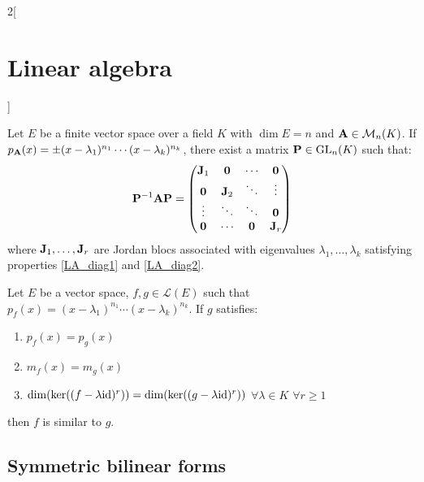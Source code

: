 \documentclass[../../../main.tex]{subfiles}
\begin{document}
\begin{multicols}{2}[\section{Linear algebra}]
\begin{prop}
    Let $E$ be a finite vector space over a field $K$ with $\dim E=n$ and $\vb{A}\in\mathcal{M}_n(K)$. If $p_{\vb{A}}(x)=\pm(x-\lambda_1)^{n_1}\cdots(x-\lambda_k)^{n_k}$, there exist a matrix $\vb{P}\in\mathrm{GL}_n(K)$ such that: 
    $$\vb{P}^{-1}\vb{A}\vb{P}=
    \begin{pmatrix}
        \vb{J}_1 & \vb{0} & \cdots & \vb{0} \\
        \vb{0} & \vb{J}_2 & \ddots & \vdots \\
        \vdots & \ddots & \ddots & \vb{0} \\
        \vb{0} & \cdots & \vb{0} & \vb{J}_r \\
    \end{pmatrix}
    $$
    where $\vb{J}_1,\ldots,\vb{J}_r$ are Jordan blocs associated with eigenvalues $\lambda_1,\ldots,\lambda_k$ satisfying properties \ref{LA_diag1} and \ref{LA_diag2}.
\end{prop}
\begin{theorem}
    Let $E$ be a vector space, $f,g\in\mathcal{L}(E)$ such that $p_f(x)=(x-\lambda_1)^{n_1}\cdots(x-\lambda_k)^{n_k}$. If $g$ satisfies:
    \begin{enumerate}
        \item $p_f(x)=p_g(x)$
        \item $m_f(x)=m_g(x)$
        \item $\dim(\ker((f-\lambda \mathrm{id})^r))=\dim(\ker((g-\lambda \mathrm{id})^r))$ $\forall\lambda\in K$ $\forall r\geq 1$
    \end{enumerate}
    then $f$ is similar to $g$.
\end{theorem}
\subsection{Symmetric bilinear forms}

\end{multicols}
\end{document}
